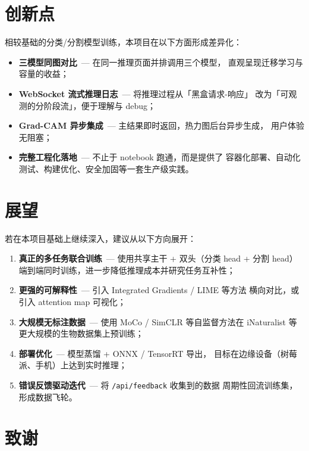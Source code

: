 \documentclass[12pt, a4paper, openany]{ctexbook}
\begin{document}
\section{创新点}

相较基础的分类/分割模型训练，本项目在以下方面形成差异化：

\begin{itemize}[leftmargin=*]
  \item \textbf{三模型同图对比}\ — 在同一推理页面并排调用三个模型，
        直观呈现迁移学习与容量的收益；
  \item \textbf{WebSocket 流式推理日志}\ — 将推理过程从「黑盒请求-响应」
        改为「可观测的分阶段流」，便于理解与 debug；
  \item \textbf{Grad-CAM 异步集成}\ — 主结果即时返回，热力图后台异步生成，
        用户体验无阻塞；
  \item \textbf{完整工程化落地}\ — 不止于 notebook 跑通，而是提供了
        容器化部署、自动化测试、构建优化、安全加固等一套生产级实践。
\end{itemize}

\section{展望}

若在本项目基础上继续深入，建议从以下方向展开：

\begin{enumerate}[leftmargin=*]
  \item \textbf{真正的多任务联合训练}\ — 使用共享主干 + 双头（分类 head + 分割 head）
        端到端同时训练，进一步降低推理成本并研究任务互补性；
  \item \textbf{更强的可解释性}\ — 引入 Integrated Gradients / LIME 等方法
        横向对比，或引入 attention map 可视化；
  \item \textbf{大规模无标注数据}\ — 使用 MoCo / SimCLR 等自监督方法在
        iNaturalist 等更大规模的生物数据集上预训练；
  \item \textbf{部署优化}\ — 模型蒸馏 + ONNX / TensorRT 导出，
        目标在边缘设备（树莓派、手机）上达到实时推理；
  \item \textbf{错误反馈驱动迭代}\ — 将 \texttt{/api/feedback} 收集到的数据
        周期性回流训练集，形成数据飞轮。
\end{enumerate}

\section{致谢}
\end{document}
